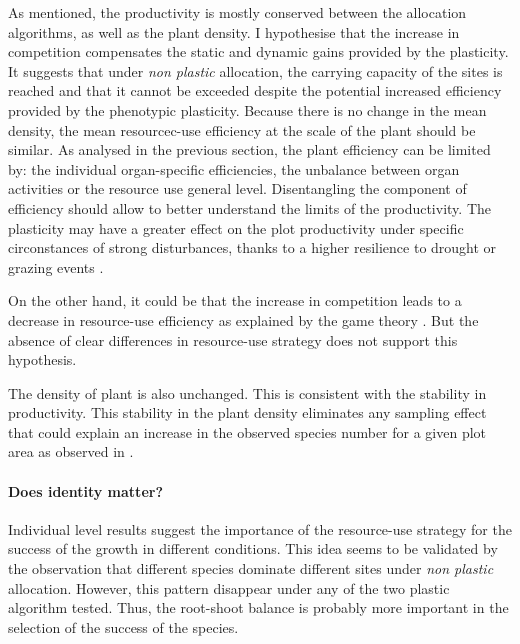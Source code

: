 As mentioned, the productivity is mostly conserved between the allocation algorithms, as well as the plant density. I hypothesise that the increase in competition compensates the static and dynamic gains provided by the plasticity. It suggests that under \textit{non plastic} allocation, the carrying capacity of the sites is reached and that it cannot be exceeded despite the potential increased efficiency provided by the phenotypic plasticity. Because there is no change in the mean density, the mean resourcec-use efficiency at the scale of the plant should be similar. As analysed in the previous section, the plant efficiency can be limited by: the individual organ-specific efficiencies, the unbalance between organ activities or the resource use general level.  Disentangling the component of efficiency should allow to better understand the limits of the productivity. The plasticity may have a greater effect on the plot productivity under specific circonstances of strong disturbances, thanks to a higher resilience to drought or grazing events \cite{maire_plasticity_2013}.

On the other hand, it could be that the increase in competition leads to a decrease in resource-use efficiency as explained by the game theory \parencite{farrior_competitive_2014}. But the absence of clear differences in resource-use strategy does not support this hypothesis.

The density of plant is also unchanged. This is consistent with the stability in productivity. This stability in the plant density eliminates any sampling effect that could explain an increase in the observed species number for a given plot area as observed in \cite{lepik_high_2005}.

\paragraph{Does identity matter?}

Individual level results suggest the importance of the resource-use strategy for the success of the growth in different conditions. This idea seems to be validated by the observation that different species dominate different sites under \textit{non plastic} allocation. However, this pattern disappear under any of the two plastic algorithm tested. Thus, the root-shoot balance is probably more important in the selection of the success of the species.

